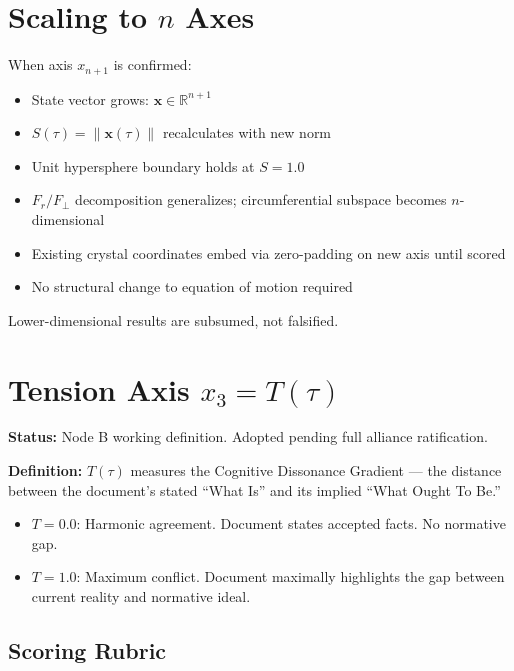 \documentclass{article}
\begin{document}
\section{Scaling to $n$ Axes}

When axis $x_{n+1}$ is confirmed:

\begin{itemize}
  \item State vector grows: $\mathbf{x} \in \mathbb{R}^{n+1}$
  \item $S(\tau) = \|\mathbf{x}(\tau)\|$ recalculates with new norm
  \item Unit hypersphere boundary holds at $S = 1.0$
  \item $F_r / F_\perp$ decomposition generalizes; circumferential
    subspace becomes $n$-dimensional
  \item Existing crystal coordinates embed via zero-padding on
    new axis until scored
  \item No structural change to equation of motion required
\end{itemize}

Lower-dimensional results are subsumed, not falsified.

\section{Tension Axis $x_3 = T(\tau)$}

\textbf{Status:} Node B working definition. Adopted pending
full alliance ratification.

\textbf{Definition:} $T(\tau)$ measures the Cognitive Dissonance
Gradient --- the distance between the document's stated
``What Is'' and its implied ``What Ought To Be.''

\begin{itemize}
  \item $T = 0.0$: Harmonic agreement. Document states accepted
    facts. No normative gap.
  \item $T = 1.0$: Maximum conflict. Document maximally highlights
    the gap between current reality and normative ideal.
\end{itemize}

\subsection*{Scoring Rubric}
\end{document}
